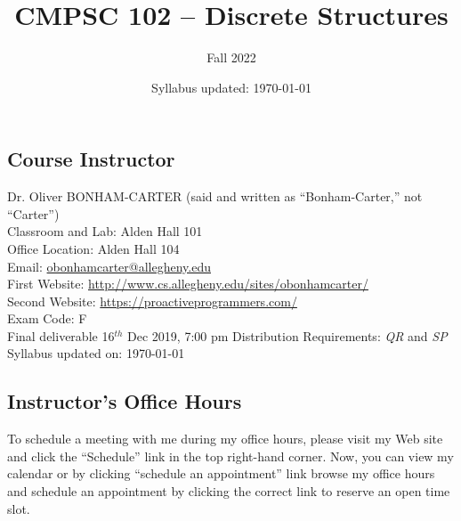 \documentclass[11pt]{article} %
\title{\textbf{CMPSC 102 -- Discrete Structures}}
\author{Fall 2022}
\date{Syllabus updated: \today} %
\begin{document}
\maketitle

\subsection*{\textbf{Course Instructor}}
Dr. Oliver BONHAM-CARTER (said and written as ``Bonham-Carter,'' not “Carter'')\\
\noindent Classroom and Lab: Alden Hall 101 \\
\noindent Office Location: Alden Hall 104 \\
\noindent Email: \url{obonhamcarter@allegheny.edu} \\
\noindent First Website: \url{http://www.cs.allegheny.edu/sites/obonhamcarter/} \\
\noindent Second Website: \url{https://proactiveprogrammers.com/}\\
\noindent Exam Code: F\\
\noindent Final deliverable 16$^{th}$ Dec 2019, 7:00 pm
\noindent Distribution Requirements: \emph{QR} and \emph{SP}\\
\noindent Syllabus updated on: \today\\


\subsection*{Instructor's Office Hours}




\noindent
To schedule a meeting with me during my office hours, please visit my Web site and click the ``Schedule'' link in the top right-hand corner. Now, you can view my calendar or by clicking ``schedule an appointment'' link browse my office hours and schedule an appointment by clicking the correct link to reserve an open time slot. 
\end{document}
